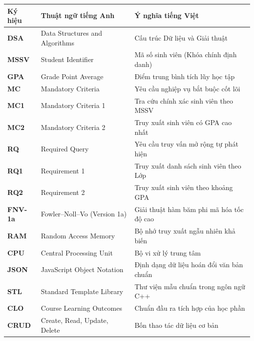 \documentclass[14pt,a4paper]{extarticle}
\begin{document}
\begin{table}[H]
\centering
\begingroup
{}
\setlength{\tabcolsep}{4pt}
\renewcommand{\arraystretch}{1.15}
\begin{tabularx}{\textwidth}{|>{\bfseries}m{2.3cm}|m{5.5cm}|X|}
\hline
\textbf{Ký hiệu} & \textbf{Thuật ngữ tiếng Anh} & \textbf{Ý nghĩa tiếng Việt} \\ \hline
DSA & Data Structures and Algorithms & Cấu trúc Dữ liệu và Giải thuật \\ \hline
MSSV & Student Identifier & Mã số sinh viên (Khóa chính định danh) \\ \hline
GPA & Grade Point Average & Điểm trung bình tích lũy học tập \\ \hline
MC & Mandatory Criteria & Yêu cầu nghiệp vụ bắt buộc cốt lõi \\ \hline
MC1 & Mandatory Criteria 1 & Tra cứu chính xác sinh viên theo MSSV \\ \hline
MC2 & Mandatory Criteria 2 & Truy xuất sinh viên có GPA cao nhất \\ \hline
RQ & Required Query & Yêu cầu truy vấn mở rộng tự phát hiện \\ \hline
RQ1 & Requirement 1 & Truy xuất danh sách sinh viên theo Lớp \\ \hline
RQ2 & Requirement 2 & Truy xuất sinh viên theo khoảng GPA \\ \hline
FNV-1a & Fowler--Noll--Vo (Version 1a) & Giải thuật hàm băm phi mã hóa tốc độ cao \\ \hline
RAM & Random Access Memory & Bộ nhớ truy xuất ngẫu nhiên khả biến \\ \hline
CPU & Central Processing Unit & Bộ vi xử lý trung tâm \\ \hline
JSON & JavaScript Object Notation & Định dạng dữ liệu hoán đổi văn bản chuẩn \\ \hline
STL & Standard Template Library & Thư viện mẫu chuẩn trong ngôn ngữ C++ \\ \hline
CLO & Course Learning Outcomes & Chuẩn đầu ra tích hợp của học phần \\ \hline
CRUD & Create, Read, Update, Delete & Bốn thao tác dữ liệu cơ bản \\ \hline
\end{tabularx}
\endgroup
\end{table}

\newpage
\pagestyle{fancy}
\setcounter{page}{1}
\end{document}
